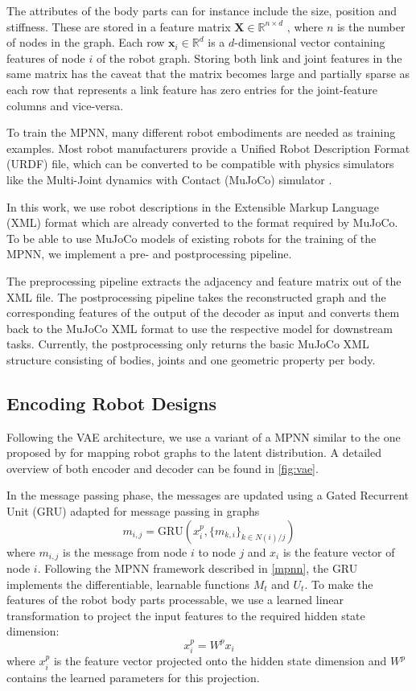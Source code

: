 \documentclass{article}
\theoremstyle{plain}
\theoremstyle{definition}
\theoremstyle{remark}
\begin{document}
The attributes of the body parts can for instance include the size, position and stiffness. These are stored in a feature matrix $\mathbf{X} \in \mathbb{R}^{n \times d}$ , where $n$ is the number of nodes in the graph. Each row $\mathbf{x}_i \in \mathbb{R}^d$ is a $d$-dimensional vector containing features of node $i$ of the robot graph. Storing both link and joint features in the same matrix has the caveat that the matrix becomes large and partially sparse as each row that represents a link feature has zero entries for the joint-feature columns and vice-versa.

To train the MPNN, many different robot embodiments are needed as training examples. Most robot manufacturers provide a Unified Robot Description Format (URDF) file, which can be converted to be compatible with physics simulators like the Multi-Joint dynamics with Contact (MuJoCo) simulator \cite{todorov2012mujoco}. 

In this work, we use robot descriptions in the Extensible Markup Language (XML) format which are already converted to the format required by MuJoCo. To be able to use MuJoCo models of existing robots for the training of the MPNN, we implement a pre- and postprocessing pipeline.

The preprocessing pipeline extracts the adjacency and feature matrix out of the XML file. The postprocessing pipeline takes the reconstructed graph and the corresponding features of the output of the decoder as input and converts them back to the MuJoCo XML format to use the respective model for downstream tasks. Currently, the postprocessing only returns the basic MuJoCo XML structure consisting of bodies, joints and one geometric property per body.

\subsection{Encoding Robot Designs}
Following the VAE architecture, we use a variant of a MPNN similar to the one proposed by \citet{jin2018junction} for mapping robot graphs to the latent distribution. A detailed overview of both encoder and decoder can be found in \cref{fig:vae}.

In the message passing phase, the messages are updated using a Gated Recurrent Unit (GRU)
\cite{chung2014empirical} adapted for message passing in graphs
\begin{equation}
m_{i,j} = \text{GRU}(x_i^p, \{m_{k, i}\}_{k \in N(i)/j})
\end{equation}
where $m_{i,j}$ is the message from node $i$ to node $j$ and $x_i$ is the feature vector of node $i$. 
Following the MPNN framework described in \cref{mpnn}, the GRU implements the differentiable, learnable functions $M_t$ and $U_t$. To make the features of the robot body parts processable, we use a learned linear transformation to project the input features to the required hidden state dimension: 
\begin{equation}
x_i^{p} = W^{p} x_i 
\end{equation}
where $x_i^{p}$ is the feature vector projected onto the hidden state dimension and $W^p$ contains the learned parameters for this projection.
\end{document}

